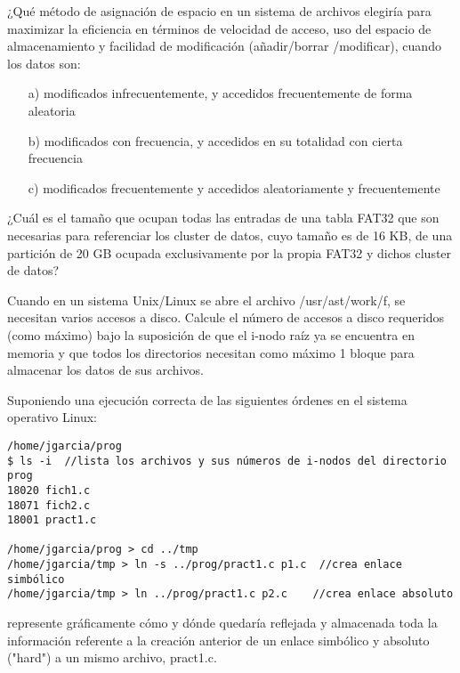 \begin{ejercicio}
¿Qué método de asignación de espacio en un sistema de archivos elegiría para maximizar la eficiencia en términos de velocidad de acceso, uso del espacio de almacenamiento y facilidad de modificación (añadir/borrar /modificar), cuando los datos son:
\begin{itemize}
    \item[a)] modificados infrecuentemente, y accedidos frecuentemente de forma aleatoria
    \item[b)] modificados con frecuencia, y accedidos en su totalidad con cierta frecuencia
    \item[c)] modificados frecuentemente y accedidos aleatoriamente y frecuentemente
\end{itemize}
\end{ejercicio}

\begin{ejercicio}
¿Cuál es el tamaño que ocupan todas las entradas de una tabla FAT32 que son necesarias para referenciar los cluster de datos, cuyo tamaño es de 16 KB, de una partición de 20 GB ocupada exclusivamente por la propia FAT32 y dichos cluster de datos?
\end{ejercicio}

\begin{ejercicio}
Cuando en un sistema Unix/Linux se abre el archivo /usr/ast/work/f, se necesitan varios accesos a disco. Calcule el número de accesos a disco requeridos (como máximo) bajo la suposición de que el i-nodo raíz ya se encuentra en memoria y que todos los directorios necesitan como máximo 1 bloque para almacenar los datos de sus archivos.
\end{ejercicio}
\begin{ejercicio}
Suponiendo una ejecución correcta de las siguientes órdenes en el sistema operativo Linux:

\begin{verbatim}
/home/jgarcia/prog
$ ls -i  //lista los archivos y sus números de i-nodos del directorio prog
18020 fich1.c
18071 fich2.c
18001 pract1.c

/home/jgarcia/prog > cd ../tmp
/home/jgarcia/tmp > ln -s ../prog/pract1.c p1.c  //crea enlace simbólico
/home/jgarcia/tmp > ln ../prog/pract1.c p2.c    //crea enlace absoluto
\end{verbatim}

represente gráficamente cómo y dónde quedaría reflejada y almacenada toda la información referente a la creación anterior de un enlace simbólico y absoluto ("hard") a un mismo archivo, pract1.c.
\end{ejercicio}

